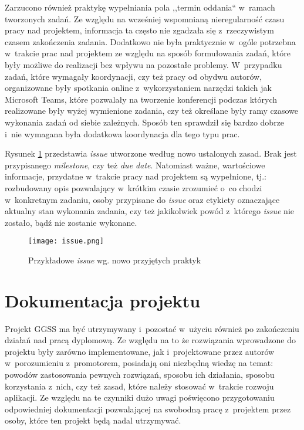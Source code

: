 Zarzucono również praktykę wypełniania pola ,,termin oddania`` w~ramach tworzonych zadań. Ze względu na  wcześniej wspomnianą nieregularność czasu pracy nad projektem, informacja ta często nie zgadzała się z~rzeczywistym czasem zakończenia zadania. Dodatkowo nie była praktycznie w~ogóle potrzebna w~trakcie prac nad projektem ze względu na sposób formułowania zadań, które były możliwe do realizacji bez wpływu na pozostałe problemy. W~przypadku zadań, które wymagały koordynacji, czy też pracy od obydwu autorów, organizowane były spotkania online z~wykorzystaniem narzędzi takich jak Microsoft Teams, które pozwalały na tworzenie konferencji podczas których realizowane były wyżej wymienione zadania, czy też określane były ramy czasowe wykonania zadań od siebie zależnych. Sposób ten sprawdził się bardzo dobrze i~nie wymagana była dodatkowa koordynacja dla tego typu prac.

Rysunek \ref{fig:issue} przedstawia \emph{issue} utworzone według nowo ustalonych zasad. Brak jest przypisanego \emph{milestone}, czy też \emph{due date}. Natomiast ważne, wartościowe informacje, przydatne w~trakcie pracy nad projektem są wypełnione, tj.: rozbudowany opis pozwalający w~krótkim czasie zrozumieć o~co chodzi w~konkretnym zadaniu, osoby przypisane do \emph{issue} oraz etykiety oznaczające aktualny stan wykonania zadania, czy też jakikolwiek powód z~którego \emph{issue} nie zostało, bądź nie zostanie wykonane.

\begin{figure}[H]
    \centering
    \texttt{[image: issue.png]}
    \caption{Przykładowe \emph{issue} wg. nowo przyjętych praktyk}
    \label{fig:issue}
\end{figure}


\newpage
\section{Dokumentacja projektu}

Projekt GGSS ma być utrzymywany i~pozostać w~użyciu również po zakończeniu działań nad pracą dyplomową. Ze względu na to że rozwiązania wprowadzone do projektu były zarówno implementowane, jak i~projektowane przez autorów w~porozumieniu z~promotorem, posiadają oni niezbędną wiedzę na temat: powodów zastosowania pewnych rozwiązań, sposobu ich działania, sposobu korzystania z~nich, czy też zasad, które należy stosować w~trakcie rozwoju aplikacji. Ze względu na te czynniki dużo uwagi poświęcono przygotowaniu odpowiedniej dokumentacji pozwalającej na swobodną pracę z~projektem przez osoby, które ten projekt będą nadal utrzymywać.

